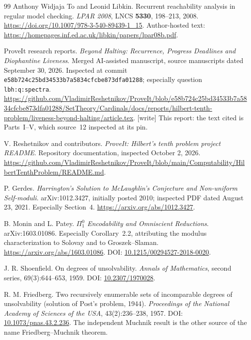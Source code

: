 \documentclass[11pt,letterpaper]{article}
\theoremstyle{definition}
\theoremstyle{remark}
\newcommand{\code}[1]{\texttt{#1}}
\newcommand{\1}{\mathbf 1}
\newcommand{\wtag}{\textup{[write]}}%
\begin{document}
\begin{thebibliography}{99}
Anthony Widjaja To and Leonid Libkin.
Recurrent reachability analysis in regular model checking.
\emph{LPAR 2008}, LNCS \textbf{5330}, 198--213, 2008.
\url{https://doi.org/10.1007/978-3-540-89439-1_15}.
Author-hosted text:
\url{https://homepages.inf.ed.ac.uk/libkin/papers/lpar08b.pdf}.

ProveIt research reports.
\emph{Beyond Halting: Recurrence, Progress Deadlines and Diophantine
Liveness}. Merged AI-assisted manuscript, source manuscripts dated
September 30, 2026. Inspected at commit
\code{e58b724c25bd34533b7a5834cfcbe873dfa01288}; especially question
\code{lbh:q:spectra}.\newline
\url{https://github.com/VladimirReshetnikov/ProveIt/blob/e58b724c25bd34533b7a5834cfcbe873dfa01288/SetTheory/Cardinals/docs/reports/hilbert-tenth-problem/liveness-beyond-halting/article.tex}.
\wtag{} This report: the text cited is Parts~I--V, which source~12 inspected at its pin.

V. Reshetnikov and contributors.
\emph{ProveIt: Hilbert's tenth problem project README}.
Repository documentation, inspected October 2, 2026.\newline
\url{https://github.com/VladimirReshetnikov/ProveIt/blob/main/Computability/HilbertTenthProblem/README.md}.

P. Gerdes.
\emph{Harrington's Solution to McLaughlin's Conjecture and Non-uniform
Self-moduli}. arXiv:1012.3427, initially posted 2010; inspected PDF dated
August 23, 2021. Especially Section~4.\newline
\url{https://arxiv.org/abs/1012.3427}.

B. Monin and L. Patey.
\emph{$\Pi^0_1$ Encodability and Omniscient Reductions}.
arXiv:1603.01086. Especially Corollary~2.2, attributing the modulus
characterization to Solovay and to Groszek--Slaman.\newline
\url{https://arxiv.org/abs/1603.01086}.
DOI: \href{https://doi.org/10.1215/00294527-2018-0020}{10.1215/00294527-2018-0020}.

J. R. Shoenfield.
On degrees of unsolvability.
\emph{Annals of Mathematics}, second series, 69(3):644--653, 1959.\newline
DOI: \href{https://doi.org/10.2307/1970028}{10.2307/1970028}.

R. M. Friedberg.
Two recursively enumerable sets of incomparable degrees of unsolvability
(solution of Post's problem, 1944).
\emph{Proceedings of the National Academy of Sciences of the USA},
43(2):236--238, 1957.\newline
DOI: \href{https://doi.org/10.1073/pnas.43.2.236}{10.1073/pnas.43.2.236}.
The independent Muchnik result is the other source of the name
Friedberg--Muchnik theorem.


\end{thebibliography}
\end{document}
